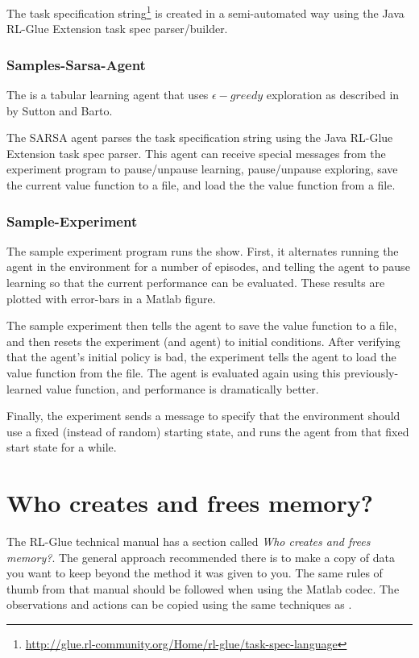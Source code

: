 \documentclass[11pt]{article}
\begin{document}
The task specification string\footnote{\url{http://glue.rl-community.org/Home/rl-glue/task-spec-language}} is created in a semi-automated way using the Java RL-Glue Extension task spec parser/builder. 

\subsubsection{Samples-Sarsa-Agent}
\label{sarsa-sample}
The 
is a tabular learning agent that uses $\epsilon-greedy$ exploration as described in  by Sutton and Barto.

The SARSA agent parses the task specification string using the Java RL-Glue Extension task spec parser.  This agent can receive special messages from the experiment program to pause/unpause learning, pause/unpause exploring, save the current value function to a file, and load the the value function from a file.

\subsubsection{Sample-Experiment}
The sample experiment program runs the show.  First, it alternates running the agent in the environment for a number of episodes, and telling the agent to pause learning so that the current performance can be evaluated.  These results are plotted with error-bars in a Matlab figure.

The sample experiment then tells the agent to save the value function to a file, and then resets the experiment (and agent) to initial conditions.  After verifying that the agent's initial policy is bad, the experiment tells the agent to load the value function from the file.  The agent is evaluated again using this previously-learned value function, and performance is dramatically better.

Finally, the experiment sends a message to specify that the environment should use a fixed (instead of random) starting state, and runs the agent from that fixed start state for a while.

\section{Who creates and frees memory?}
The RL-Glue technical manual has a section called \textit{Who creates and frees memory?}.  The general approach recommended there is to make a copy of data you want to keep beyond the method it was given to you.  The same rules of thumb from that manual should be followed when using the Matlab codec.  The observations and actions can be copied using the same techniques as .
\end{document}
